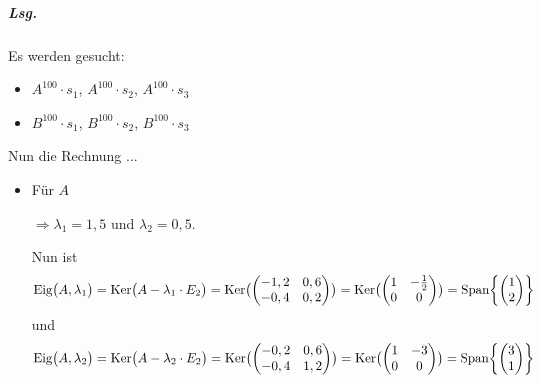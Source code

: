 \documentclass{scrreprt}
\begin{document}
\subparagraph{Lsg.} Es werden gesucht:
\begin{itemize}
\item $A^{100} \cdot s_1$, $A^{100} \cdot s_2$, $A^{100} \cdot s_3$
\item $B^{100} \cdot s_1$, $B^{100} \cdot s_2$, $B^{100} \cdot s_3$
\end{itemize}
Nun die Rechnung ...
\begin{itemize}
\item Für $A$
  $\Rightarrow \lambda_1 = 1,5$ und $\lambda_2 = 0,5$.

  \newpage
  Nun ist
  \[
    \text{Eig}\qty\big(A, \lambda_1)
    = \text{Ker}\qty\big(A - \lambda_1 \cdot E_2)
    = \text{Ker}\qty\big(\begin{pmatrix}
      -1,2 & 0,6 \\
      -0,4 & 0,2 \\
    \end{pmatrix})
    = \text{Ker}\qty\big(\begin{pmatrix}
      1 & -\frac{1}{2} \\
      0 & 0            \\
    \end{pmatrix})
    = \text{Span}\qty{\begin{pmatrix} 1 \\ 2 \end{pmatrix}}
  \]
  und
  \[
    \text{Eig}\qty\big(A, \lambda_2)
    = \text{Ker}\qty\big(A - \lambda_2 \cdot E_2)
    = \text{Ker}\qty\big(\begin{pmatrix}
      -0,2 & 0,6 \\
      -0,4 & 1,2 \\
    \end{pmatrix})
    = \text{Ker}\qty\big(\begin{pmatrix}
      1 & -3 \\
      0 & 0  \\
    \end{pmatrix})
    = \text{Span}\qty{\begin{pmatrix} 3 \\ 1 \end{pmatrix}}
  \]


\end{itemize}
\end{document}
